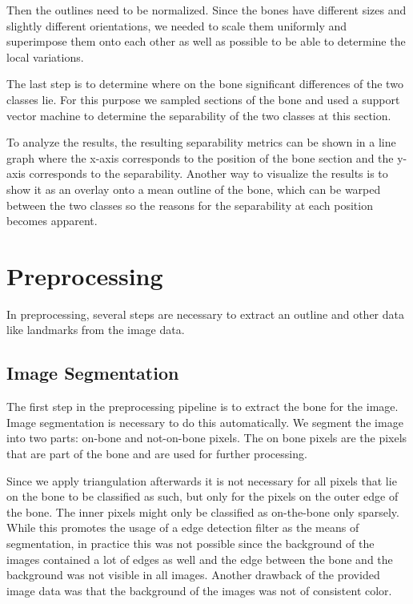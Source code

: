 \documentclass[pdftex,12pt,a4paper]{report}
\begin{document}
Then the outlines need to be normalized. Since the bones have different sizes and slightly different orientations, we needed to scale them uniformly and superimpose them onto each other as well as possible to be able to determine the local variations.

The last step is to determine where on the bone significant differences of the two classes lie. For this purpose we sampled sections of the bone and used a support vector machine to determine the separability of the two classes at this section.

To analyze the results, the resulting separability metrics can be shown in a line graph where the x-axis corresponds to the position of the bone section and the y-axis corresponds to the separability. Another way to visualize the results is to show it as an overlay onto a mean outline of the bone, which can be warped between the two classes so the reasons for the separability at each position becomes apparent.

\section{Preprocessing}

In preprocessing, several steps are necessary to extract an outline and other data like landmarks from the image data.

\subsection{Image Segmentation}
\label{sub:segmentation}

The first step in the preprocessing pipeline is to extract the bone for the image. Image segmentation
is necessary to do this automatically. We segment the image into two parts: on-bone and not-on-bone pixels.
The on bone pixels are the pixels that are part of the bone and are used for further processing.

Since we apply triangulation afterwards it is not necessary for all pixels that lie on the bone
to be classified as such, but only for the pixels on the outer edge of the bone. The inner pixels
might only be classified as on-the-bone only sparsely. While this promotes the usage of a edge detection
filter as the means of segmentation, in practice this was not possible since the background of the
images contained a lot of edges as well and the edge between the bone and the background was not
visible in all images. Another drawback of the provided image data was that the background of the images
was not of consistent color.
\end{document}
